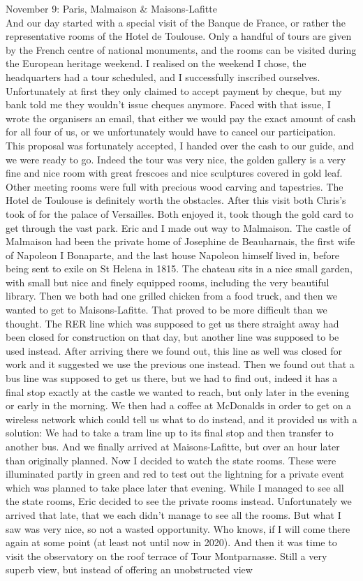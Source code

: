November 9: Paris, Malmaison \& Maisons-Lafitte\\
And our day started with a special visit of the Banque de France, or rather the representative rooms of the Hotel de Toulouse. Only a handful of tours are given by the French centre of national monuments, and the rooms can be visited during the European heritage weekend. I realised on the weekend I chose, the headquarters had a tour scheduled, and I successfully inscribed ourselves. Unfortunately at first they only claimed to accept payment by cheque, but my bank told me they wouldn't issue cheques anymore. Faced with that issue, I wrote the organisers an email, that either we would pay the exact amount of cash for all four of us, or we unfortunately would have to cancel our participation. This proposal was fortunately accepted, I handed over the cash to our guide, and we were ready to go. Indeed the tour was very nice, the golden gallery is a very fine and nice room with great frescoes and nice sculptures covered in gold leaf. Other meeting rooms were full with precious wood carving and tapestries. The Hotel de Toulouse is definitely worth the obstacles. After this visit both Chris's took of for the palace of Versailles. Both enjoyed it, took though the gold card to get through the vast park. Eric and I made out way to Malmaison. The castle of Malmaison had been the private home of Josephine de Beauharnais, the first wife of Napoleon I Bonaparte, and the last house Napoleon himself lived in, before being sent to exile on St Helena in 1815. The chateau sits in a nice small garden, with small but nice and finely equipped rooms, including the very beautiful library. Then we both had one grilled chicken from a food truck, and then we wanted to get to Maisons-Lafitte. That proved to be more difficult than we thought. The RER line which was supposed to get us there straight away had been closed for construction on that day, but another line was supposed to be used instead. After arriving there we found out, this line as well was closed for work and it suggested we use the previous one instead. Then we found out that a bus line was supposed to get us there, but we had to find out, indeed it has a final stop exactly at the castle we wanted to reach, but only later in the evening or early in the morning. We then had a coffee at McDonalds in order to get on a wireless network which could tell us what to do instead, and it provided us with a solution: We had to take a tram line up to its final stop and then transfer to another bus. And we finally arrived at Maisons-Lafitte, but over an hour later than originally planned. Now I decided to watch the state rooms. These were illuminated partly in green and red to test out the lightning for a private event which was planned to take place later that evening. While I managed to see all the state rooms, Eric decided to see the private rooms instead. Unfortunately we arrived that late, that we each didn't manage to see all the rooms. But what I saw was very nice, so not a wasted opportunity. Who knows, if I will come there again at some point (at least not until now in 2020). And then it was time to visit the observatory on the roof terrace of Tour Montparnasse. Still a very superb view, but instead of offering an unobstructed view 